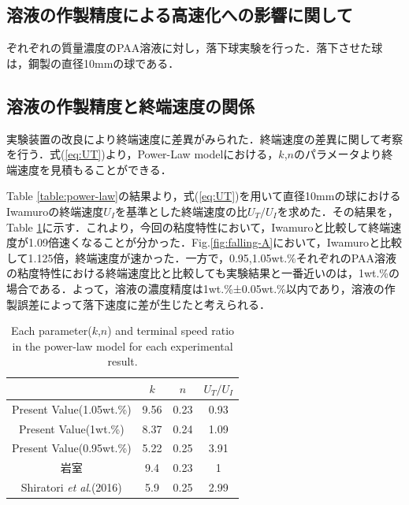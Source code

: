 \subsection{溶液の作製精度による高速化への影響に関して}

ぞれぞれの質量濃度のPAA溶液に対し，落下球実験を行った．落下させた球は，鋼製の直径10mmの球である．

\subsection{溶液の作製精度と終端速度の関係}

実験装置の改良により終端速度に差異がみられた．終端速度の差異に関して考察を行う．式(\ref{eq:UT})より，Power-Law modelにおける，$k$,$n$のパラメータより終端速度を見積もることができる．

Table \ref{table:power-law}の結果より，式(\ref{eq:UT})を用いて直径10mmの球におけるIwamuro\cite{ref:8}の終端速度$U_I$を基準とした終端速度の比$U_T/U_{I}$を求めた．その結果を，Table \ref{table:UT}に示す．これより，今回の粘度特性において，Iwamuro\cite{ref:8}と比較して終端速度が1.09倍速くなることが分かった．Fig.\ref{fig:falling-A}において，Iwamuro\cite{ref:8}と比較して1.125倍，終端速度が速かった．一方で，0.95,1.05wt.\%それぞれのPAA溶液の粘度特性における終端速度比と比較しても実験結果と一番近いのは，1wt.\%の場合である．よって，溶液の濃度精度は1wt.\%±0.05wt.\%以内であり，溶液の作製誤差によって落下速度に差が生じたと考えられる．

\begin{table}[h]
    \centering
    \caption{Each parameter($k$,$n$) and terminal speed ratio in the power-law model for each experimental result.}
    \label{table:UT}
    \begin{tabular}{c|c|c|c} \hline
                                                     & $k$  & $n$  & $U_T/U_{I}$ \\ \hline \hline
        Present Value(1.05wt.\%)                     & 9.56 & 0.23 & 0.93        \\
        Present Value(1wt.\%)                        & 8.37 & 0.24 & 1.09        \\
        Present Value(0.95wt.\%)                     & 5.22 & 0.25 & 3.91        \\
        岩室\cite{ref:8}                             & 9.4  & 0.23 & 1           \\
        Shiratori \textit{et al}.(2016)\cite{ref:10} & 5.9  & 0.25 & 2.99        \\ \hline
    \end{tabular}
\end{table}


